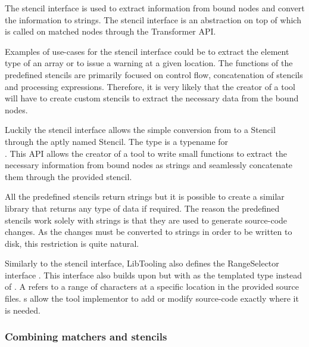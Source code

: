 The stencil interface \cite{clangStencilLibraryLibTooling2023} is used to extract information from bound nodes and convert the information to strings. The stencil interface is an abstraction on top of  which is called on matched nodes through the Transformer API. 

Examples of use-cases for the stencil interface could be to extract the element type of an array or to issue a warning at a given location. The functions of the predefined stencils are primarily focused on control flow, concatenation of stencils and processing expressions. Therefore, it is very likely that the creator of a tool will have to create custom stencils to extract the necessary data from the bound nodes.

Luckily the stencil interface allows the simple conversion from  to a Stencil through the aptly named  Stencil. The  type is a typename for \\ . This API allows the creator of a tool to write small functions to extract the necessary information from bound nodes as strings and seamlessly concatenate them through the provided  stencil.

All the predefined stencils return strings but it is possible to create a similar library that returns any type of data if required. The reason the predefined stencils work solely with strings is that they are used to generate source-code changes. As the changes must be converted to strings in order to be written to disk, this restriction is quite natural. 

Similarly to the stencil interface, LibTooling also defines the RangeSelector interface \cite{clangRangeSelectorLibraryLibTooling2023}.
This interface also builds upon  but with  as the templated type instead of . A  refers to a range of characters at a specific location in the provided source files. s allow the tool implementor to add or modify source-code exactly where it is needed.

\subsubsection*{Combining matchers and stencils}

